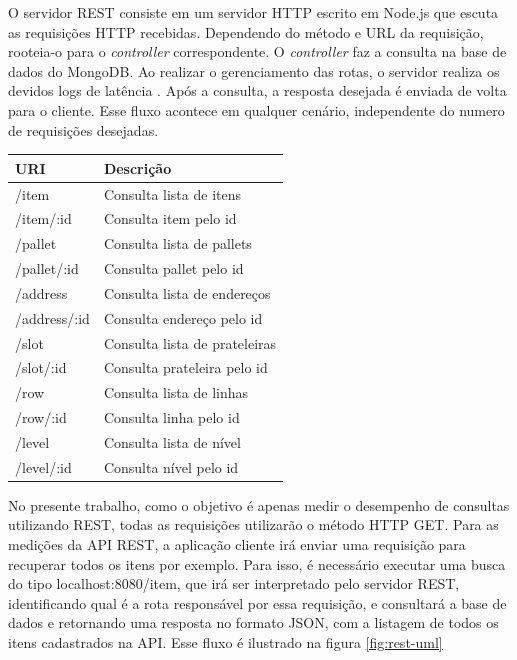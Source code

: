 O servidor REST consiste em um servidor HTTP escrito em Node.js que escuta as requisições HTTP recebidas. Dependendo do método e URL da requisição, rooteia-o para o \textit{controller} correspondente. O \textit{controller} faz a consulta na base de dados do MongoDB. Ao realizar o gerenciamento das rotas, o servidor realiza os devidos logs de latência . Após a consulta, a resposta desejada é enviada de volta para o cliente. Esse fluxo acontece em qualquer cenário, independente do numero de requisições desejadas.

\begin{center}
\begin{tabular}{| l | l |}
\hline
\textbf{URI} & \textbf{Descrição} \\ \hline
/item & Consulta lista de itens \\ \hline
/item/:id & Consulta item pelo id \\ \hline
/pallet & Consulta lista de pallets  \\ \hline
/pallet/:id & Consulta pallet pelo id  \\ \hline
/address & Consulta lista de endereços \\ \hline
/address/:id & Consulta endereço pelo id \\ \hline
/slot & Consulta lista de prateleiras \\ \hline
/slot/:id & Consulta prateleira pelo id \\ \hline
/row & Consulta lista de linhas \\ \hline
/row/:id & Consulta linha pelo id \\ \hline
/level & Consulta lista de nível \\ \hline
/level/:id & Consulta nível pelo id \\ \hline
\end{tabular}
\end{center}

No presente trabalho, como o objetivo é apenas medir o desempenho de consultas utilizando REST, todas as requisições utilizarão o método HTTP GET. Para as medições da API REST, a aplicação cliente irá enviar uma requisição para recuperar todos os itens por exemplo. Para isso, é necessário executar uma busca do tipo localhost:8080/item, que irá ser interpretado pelo servidor REST, identificando qual é a rota responsável por essa requisição, e consultará a base de dados e retornando uma resposta no formato JSON, com a listagem de todos os itens cadastrados na API. Esse fluxo é ilustrado na figura \ref{fig:rest-uml}

